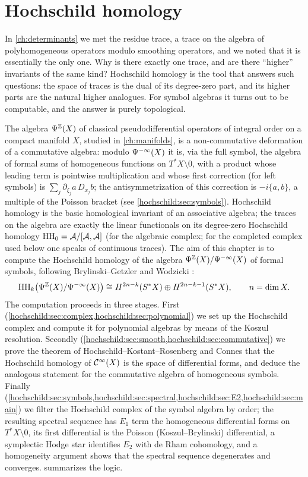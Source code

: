 \chapter{Hochschild homology}\label{ch:hochschild}
\providecommand{\cA}{\mathcal{A}}
\providecommand{\cB}{\mathcal{B}}

In \cref{ch:determinants} we met the residue trace, a trace on the algebra
of polyhomogeneous operators modulo smoothing operators, and we noted that
it is essentially the only one. Why is there exactly one trace, and are
there ``higher'' invariants of the same kind? Hochschild homology is the
tool that answers such questions: the space of traces is the dual of its
degree-zero part, and its higher parts are the natural higher analogues. For
symbol algebras it turns out to be computable, and the answer is purely
topological.

The algebra $\Psi^{\mathbb{Z}}(X)$ of classical pseudodifferential operators of
integral order on a compact manifold $X$, studied in \cref{ch:manifolds}, is
a non-commutative deformation of a commutative algebra: modulo
$\Psi^{-\infty}(X)$ it is, via the full symbol, the algebra of formal sums of
homogeneous functions on $T^*X\setminus0$, with a product whose leading term
is pointwise multiplication and whose first correction (for left symbols) is
$\sum_j\partial_{\xi_j}a\,D_{x_j}b$; the antisymmetrization of this
correction is $-i\{a,b\}$, a multiple of the Poisson bracket (see
\cref{hochschild:sec:symbols}). Hochschild homology is the basic homological
invariant of an associative algebra; the traces on the algebra are exactly the
linear functionals on its degree-zero Hochschild homology
$\HH_0=\cA/[\cA,\cA]$ (for the algebraic complex; for the completed complex
used below one speaks of continuous traces). The aim of this
chapter is to compute the Hochschild homology of the algebra
$\Psi^{\mathbb{Z}}(X)/\Psi^{-\infty}(X)$ of formal symbols, following
Brylinski--Getzler \cite{Brylinski-Getzler} and Wodzicki
\cite{Wodzicki-residue,Wodzicki-cyclic}:
\begin{equation*}
  \operatorname{HH}_k\bigl(\Psi^{\mathbb{Z}}(X)/\Psi^{-\infty}(X)\bigr)\cong H^{2n-k}(S^*X)\oplus
  H^{2n-k-1}(S^*X),\qquad n=\dim X .
\end{equation*}
The computation proceeds in three stages. First (\cref{hochschild:sec:complex,hochschild:sec:polynomial})
we set up the Hochschild complex and compute it for polynomial algebras by
means of the Koszul resolution. Secondly (\cref{hochschild:sec:smooth,hochschild:sec:commutative})
we prove the theorem of Hochschild--Kostant--Rosenberg and Connes that the
Hochschild homology of $\mathcal{C}^\infty(X)$ is the space of differential forms, and deduce
the analogous statement for the commutative algebra of homogeneous symbols.
Finally (\cref{hochschild:sec:symbols,hochschild:sec:spectral,hochschild:sec:E2,hochschild:sec:main})
we filter the Hochschild complex of the symbol algebra by order; the
resulting spectral sequence has $E_1$ term the homogeneous differential forms
on $T^*X\setminus0$, its first differential is the Poisson (Koszul--Brylinski)
differential, a symplectic Hodge star identifies $E_2$ with de Rham cohomology,
and a homogeneity argument shows that the spectral sequence degenerates and
converges.  summarizes the logic.


